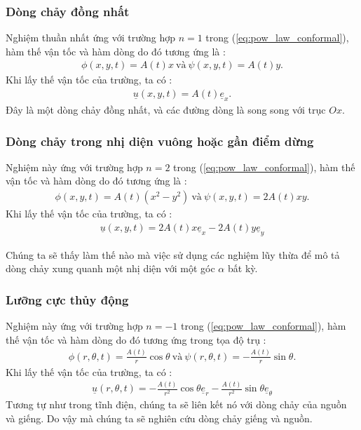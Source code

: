\documentclass[CO_LUU_CHAT.tex]{subfiles}
\begin{document}
\subsubsection{Dòng chảy đồng nhất}
Nghiệm thuần nhất ứng với trường hợp $n=1$ trong (\ref{eq:pow_law_conformal}), hàm thế vận tốc và hàm dòng do đó tương ứng là :
\begin{equation}
	\begin{aligned}
		\phi(x,y,t)=A(t)x\ \text{và}\ \psi(x,y,t)=A(t)y.
	\end{aligned}
\end{equation}
Khi lấy thế vận tốc của trường, ta có :
\begin{equation}
	\begin{aligned}
		\boxed{
			\underline{u}(x,y,t)=A(t)\underline{e}_x
		}.
	\end{aligned}
\end{equation}
Đây là một dòng chảy đồng nhất, và các đường dòng là song song với trục $Ox$.
\subsubsection{Dòng chảy trong nhị diện vuông hoặc gần điểm dừng}
Nghiệm này ứng với trường hợp $n=2$ trong (\ref{eq:pow_law_conformal}), hàm thế vận tốc và hàm dòng do đó tương ứng là :
\begin{equation}
	\begin{aligned}
		\phi(x,y,t)=A(t)(x^2-y^2)\ \text{và}\ \psi(x,y,t)=2A(t)xy.
	\end{aligned}
\end{equation}
Khi lấy thế vận tốc của trường, ta có :
\begin{equation}
	\begin{aligned}
		\underline{u}(x,y,t)=2A(t)x\underline{e}_x-2A(t)y\underline{e}_y
	\end{aligned}
\end{equation}

Chúng ta sẽ thấy làm thế nào mà việc sử dụng các nghiệm lũy thừa để mô tả dòng chảy xung quanh một nhị diện với một góc $\alpha$ bất kỳ.
\subsubsection{Lưỡng cực thủy động}
Nghiệm này ứng với trường hợp $n=-1$ trong (\ref{eq:pow_law_conformal}), hàm thế vận tốc và hàm dòng do đó tương ứng trong tọa độ trụ :
\begin{equation}
	\begin{aligned}
		\phi(r,\theta,t)=\frac{A(t)}{r}\cos\theta\ \text{và}\ \psi(r,\theta,t)=-\frac{A(t)}{r}\sin\theta.
	\end{aligned}
\end{equation}
Khi lấy thế vận tốc của trường, ta có :
\begin{equation}
	\begin{aligned}
		\underline{u}(r,\theta,t)=-\frac{A(t)}{r^2}\cos\theta\underline{e}_r-\frac{A(t)}{r^2}\sin\theta\underline{e}_\theta
	\end{aligned}
\end{equation}
Tương tự như trong tĩnh điện, chúng ta sẽ liên kết nó với dòng chảy của nguồn và giếng. Do vậy mà chúng ta sẽ nghiên cứu dòng chảy giếng và nguồn.
\end{document}
